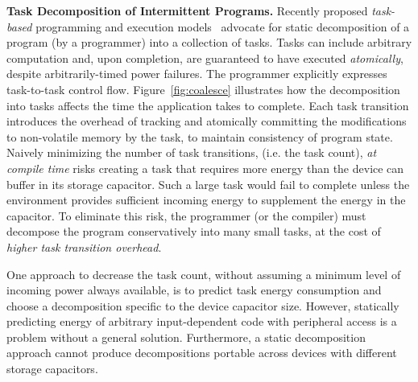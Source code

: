 \textbf{Task Decomposition of Intermittent Programs.} Recently proposed {\em
task-based} programming and execution models~\cite{alpaca,chain} advocate for
static decomposition of a program (by a programmer) into a collection of tasks.
Tasks can include arbitrary computation and, upon completion, are guaranteed to
have executed {\em atomically}, despite arbitrarily-timed power failures.
The programmer explicitly expresses task-to-task control flow. Figure~\ref{fig:coalesce} illustrates how the decomposition into tasks affects
the time the application takes to complete. Each task transition introduces the overhead of tracking and atomically committing the modifications to non-volatile memory by the task, to maintain consistency of program state. Naively minimizing the number of task transitions, (i.e. the task count), \emph{at compile time} risks creating a task that requires more energy than the device can buffer in its storage capacitor. Such a large task would fail to complete unless the environment provides
sufficient incoming energy to supplement the energy in the capacitor. To eliminate this risk, the programmer (or the compiler) must decompose the program conservatively into many small tasks, at the cost of \emph{higher task transition overhead}.

One approach to decrease the task count, without assuming a minimum level of
incoming power always available, is to predict task energy consumption and
choose a decomposition specific to the device capacitor size. However, statically predicting energy of arbitrary input-dependent code with peripheral access is a problem without a general solution. Furthermore, a static decomposition approach cannot produce decompositions portable across devices with different storage capacitors.

